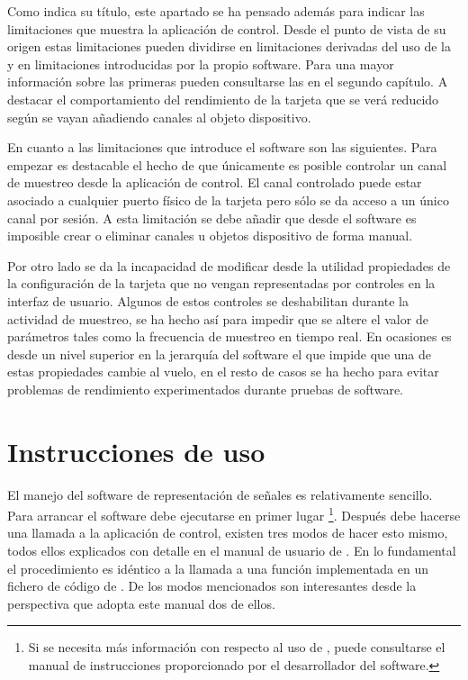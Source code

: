 Como indica su título, este apartado se ha pensado además para indicar las limitaciones que muestra la aplicación de control. Desde el punto de vista de su origen estas limitaciones pueden dividirse en limitaciones derivadas del uso de la \kpci{} y en limitaciones introducidas por la propio software. Para una mayor información sobre las primeras pueden consultarse las  en el segundo capítulo. A destacar el comportamiento del rendimiento de la tarjeta que se verá reducido según se vayan añadiendo canales al objeto dispositivo.\par
En cuanto a las limitaciones que introduce el software son las siguientes. Para empezar es destacable el hecho de que únicamente es posible controlar un canal de muestreo desde la aplicación de control. El canal controlado puede estar asociado a cualquier puerto físico de la tarjeta pero sólo se da acceso a un único canal por sesión. A esta limitación se debe añadir que desde el software es imposible crear o eliminar canales u objetos dispositivo de forma manual.\par
Por otro lado se da la incapacidad de modificar desde la utilidad propiedades de la configuración de la tarjeta que no vengan representadas por controles en la interfaz de usuario. Algunos de estos controles se deshabilitan durante la actividad de muestreo, se ha hecho así para impedir que se altere el valor de parámetros tales como la frecuencia de muestreo en tiempo real. En ocasiones es \matlab{} desde un nivel superior en la jerarquía del software el que impide que una de estas propiedades cambie al vuelo, en el resto de casos se ha hecho para evitar problemas de rendimiento experimentados durante pruebas de software.\par


\section{Instrucciones de uso}

El manejo del software de representación de señales es relativamente sencillo. Para arrancar el software debe ejecutarse en primer lugar \matlab{}\footnote{Si se necesita más información con respecto al uso de \matlab{}, puede consultarse el manual de instrucciones proporcionado por el desarrollador del software.}. Después debe hacerse una llamada a la aplicación de control, existen tres modos de hacer esto mismo, todos ellos explicados con detalle en el manual de usuario de \matlab{}. En lo fundamental el procedimiento es idéntico a la llamada a una función implementada en un fichero de código de \matlab{}. De los modos mencionados son interesantes desde la perspectiva que adopta este manual dos de ellos.\par

